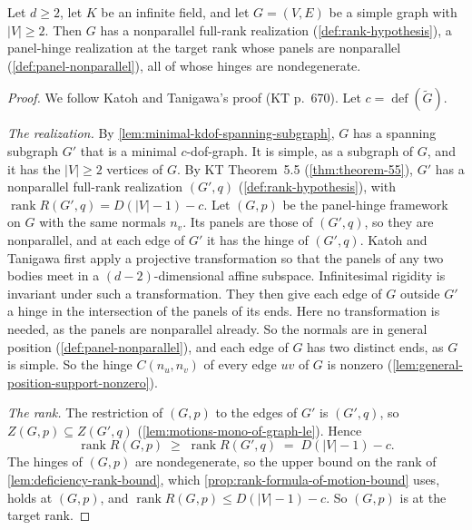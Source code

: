 \begin{theorem}
  \label{thm:theorem-55-6-genuine}
  \leanok
  Let $d \ge 2$, let $K$ be an infinite field, and let $G = (V, E)$ be a
  simple graph with $|V| \ge 2$. Then $G$ has a nonparallel full-rank
  realization (\cref{def:rank-hypothesis}), a panel-hinge realization at
  the target rank whose panels are nonparallel
  (\cref{def:panel-nonparallel}), all of whose hinges are nondegenerate.
\end{theorem}
\begin{proof}
  \leanok
  We follow Katoh and Tanigawa's proof (KT p.~670). Let
  $c = \operatorname{def}(\tilde G)$.

  \emph{The realization.} By \cref{lem:minimal-kdof-spanning-subgraph},
  $G$ has a spanning subgraph $G'$ that is a minimal $c$-dof-graph. It is
  simple, as a subgraph of $G$, and it has the $|V| \ge 2$ vertices of
  $G$. By KT Theorem~5.5 (\cref{thm:theorem-55}), $G'$ has a nonparallel
  full-rank realization $(G', q)$ (\cref{def:rank-hypothesis}), with
  $\operatorname{rank} R(G', q) = D(|V| - 1) - c$. Let $(G, p)$ be the
  panel-hinge framework on $G$ with the same normals $n_v$. Its panels are
  those of $(G', q)$, so they are nonparallel, and at each edge of $G'$ it
  has the hinge of $(G', q)$. Katoh and Tanigawa first apply a
  projective transformation so that the panels of any two bodies meet in a
  $(d-2)$-dimensional affine subspace. Infinitesimal rigidity is invariant
  under such a transformation. They then give each edge of $G$
  outside $G'$ a hinge in the intersection of the panels of its ends. Here
  no transformation is needed, as the panels are nonparallel already. So
  the normals are in general position (\cref{def:panel-nonparallel}), and
  each edge of $G$ has two distinct ends, as $G$ is simple. So the hinge
  $C(n_u, n_v)$ of every edge $uv$ of $G$ is nonzero
  (\cref{lem:general-position-support-nonzero}).

  \emph{The rank.} The restriction of $(G, p)$ to the edges of $G'$ is
  $(G', q)$, so $Z(G, p) \subseteq Z(G', q)$
  (\cref{lem:motions-mono-of-graph-le}). Hence
  \[
    \operatorname{rank} R(G, p) \;\ge\; \operatorname{rank} R(G', q)
    \;=\; D(|V| - 1) - c.
  \]
  The hinges of $(G, p)$ are nondegenerate, so the upper bound on the rank
  of \cref{lem:deficiency-rank-bound}, which
  \cref{prop:rank-formula-of-motion-bound} uses, holds at $(G, p)$, and
  $\operatorname{rank} R(G, p) \le D(|V| - 1) - c$. So $(G, p)$ is at the
  target rank.
\end{proof}

